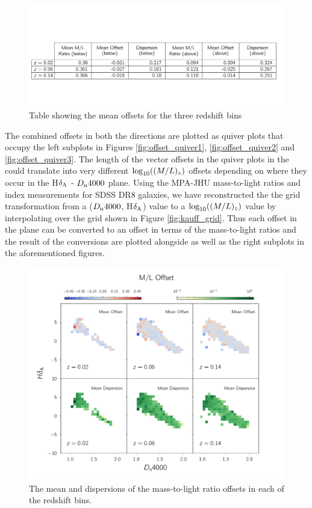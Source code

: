 \begin{figure}
\includegraphics[width=\textwidth]{figures/table.pdf}
\caption[Table showing the mean offsets for the three redshift bins.]
{Table showing the mean offsets for the three redshift bins
\label{tab: mean_offset_table}}
\end{figure}

The combined offsets in both the directions are plotted as quiver plots that occupy the left subplots in Figures \ref{fig:offset_quiver1}, \ref{fig:offset_quiver2} and \ref{fig:offset_quiver3}. The length of the vector offsets in the quiver plots in the could translate into very different ${\rm log}_{10}((M/L)_{z})$ offsets depending on where they occur in the H$\delta_{\rm A}$ - $D_{\rm n}4000$ plane. Using the MPA-JHU mass-to-light ratios and index measurements for SDSS DR8 galaxies, we have reconstructed the the grid transformation from a ($D_{\rm n}4000$, H$\delta_{\rm A}$) value to a ${\rm log}_{10}((M/L)_{z})$ value by interpolating over the grid shown in Figure \ref{fig:kauff_grid}. Thus each offset in the plane can be converted to an offset in terms of the mass-to-light ratios and the result of the conversions are plotted alongside as well as the right subplots in the aforementioned figures.\\

\begin{figure}
\includegraphics[width=\textwidth]{figures/ml_offset_plot.pdf}
\caption[ The mean and dispersion of the mass-to-light ratio 
offsets in each of the redshift bins.]{The mean and 
dispersions of the mass-to-light ratio offsets in each
 of the redshift bins.
\label{dispersion_plot}}
\end{figure}

